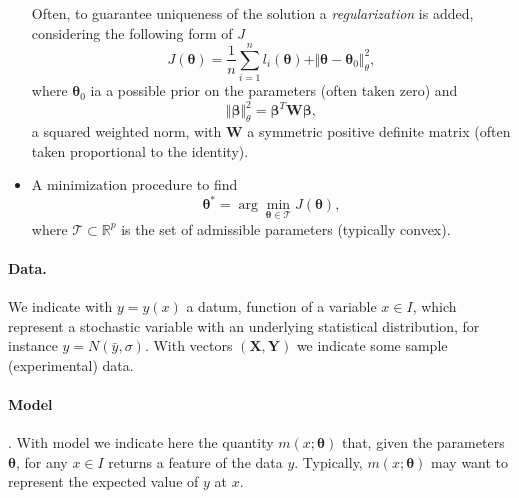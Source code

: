 \documentclass{article}
\begin{document}
\begin{itemize}
\begin{equation}
    \end{equation}
    Often, to guarantee uniqueness of the solution a \emph{regularization} is added, considering the following form of $J$
     \begin{equation}\label{eq:empiricalrreg}
   J(\boldsymbol{\theta})=\frac{1}{n}\sum_{i=1}^{n} l_i(\boldsymbol{\theta})+\Vert\boldsymbol{\theta}-\boldsymbol{\theta}_0\Vert^2_\theta,
   \end{equation}
    where $\boldsymbol{\theta}_0$ ia a possible prior on the parameters (often taken zero) and 
    \[
    \Vert\boldsymbol{\beta}\Vert^2_\theta=\boldsymbol{\beta}^T \mathbf{W} \boldsymbol{\beta},
    \]
    a squared weighted norm, with $\mathbf{W}$ a symmetric positive definite matrix (often taken proportional to the identity).
    \item A minimization procedure to find
    \begin{equation}
    \label{eq:minim}
    \boldsymbol{\theta}^*=\arg\min_{\boldsymbol{\theta}\in \mathcal{T}}J(\boldsymbol{\theta}),
    \end{equation}
    where $\mathcal{T}\subset\mathbb{R}^p$ is the set of admissible parameters (typically convex).
\end{itemize}

\paragraph{\textbf{Data}.} We indicate with $y=y(x)$ a datum, function of a variable $x\in I$, which represent a stochastic variable with an underlying statistical
  distribution, for instance $y=N(\bar{y},\sigma)$. With vectors $(\mathbf{X},\mathbf{Y})$ we indicate some sample (experimental) data.
\paragraph{\textbf{Model}}. With model we indicate here the
  quantity $m(x;\boldsymbol{\theta})$ that, given the parameters $\boldsymbol{\theta}$, for any $x\in I$ returns a feature
  of the data $y$. Typically, $m(x;\boldsymbol{\theta})$ may want to
  represent the expected value of $y$ at $x$. 
\end{document}
